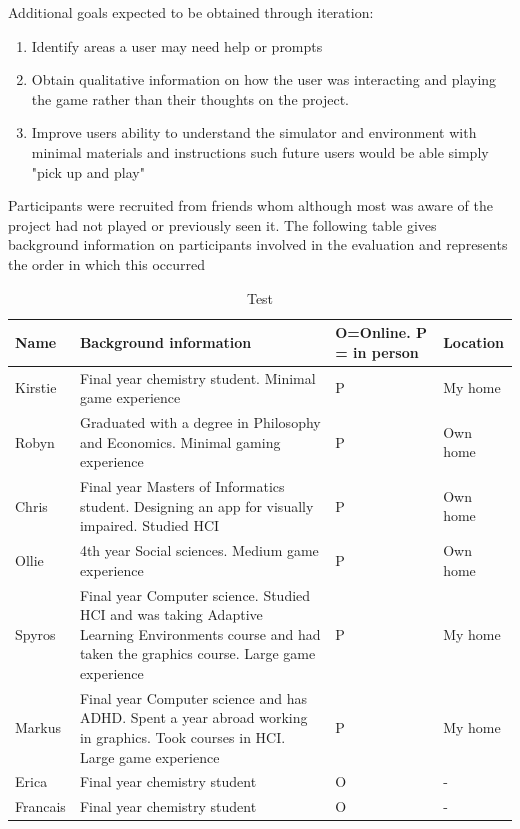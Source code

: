 \documentclass[11pt]{report}
\begin{document}
Additional goals expected to be obtained through iteration:
\begin{enumerate}
\item Identify areas a user may need help or prompts
\item Obtain qualitative information on how the user was interacting and playing the game rather than their thoughts on the project.
\item Improve users ability to understand the simulator and environment with minimal materials and instructions such future users would be able simply "pick up and play"
\end{enumerate}

Participants were recruited from friends whom although most was aware of the project had not played or previously seen it. The following table gives background information on participants involved in the evaluation and represents the order in which this occurred

\begin{table}[H]
    \begin{tabular}{| p{2cm} | p{9cm} | p{3cm} | p{3cm} |}
    \hline
    Name & Background information & O=Online. P = in person & Location \\
    \hline
    \hline
    Kirstie & Final year chemistry student. Minimal game experience & P & My home\\ \hline
    Robyn & Graduated with a degree in Philosophy and Economics. Minimal gaming experience & P & Own home \\ \hline
    Chris & Final year Masters of Informatics student. Designing an app for visually impaired. Studied HCI & P & Own home \\ \hline
    Ollie & 4th year Social sciences. Medium game experience & P & Own home \\ \hline
    Spyros & Final year Computer science. Studied HCI and was taking Adaptive Learning Environments course and had taken the graphics course. Large game experience & P & My home \\ \hline
    Markus & Final year Computer science and has ADHD. Spent a year abroad working in graphics. Took courses in HCI. Large game experience & P & My home \\ \hline
    Erica & Final year chemistry student & O & -\\ \hline
    Francais & Final year chemistry student & O & - \\ \hline
    \end{tabular}
    \caption{Test}
\end{table}
\end{document}
